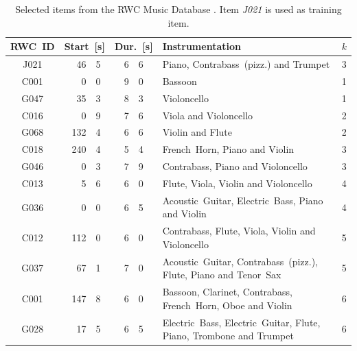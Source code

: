 \begin{table}[htb]
\center
\scriptsize
\begin{tabular}{cr@{.}lr@{.}lp{6cm}c}
\toprule[1.5pt]
RWC~ID & \multicolumn{2}{c}{Start~[s]} & \multicolumn{2}{c}{Dur.~[s]} & Instrumentation & \(k\)\\
\midrule
J021 & 46 & 5 & 6 & 6 & Piano, Contrabass~(pizz.) and Trumpet & 3\\
\hline
C001 & 0&0 & 9&0 & Bassoon & 1  \\
G047 & 35&3 & 8&3 & Violoncello & 1 \\
\hline
C016 & 0&9 & 7&6 & Viola and Violoncello & 2\\
G068 & 132&4 & 6&6 & Violin and Flute &  2\\
\hline
C018 & 240&4 & 5&4 & French~Horn, Piano and Violin & 3\\
G046 & 0&3 & 7&9 & Contrabass, Piano and Violoncello & 3\\
\hline
C013 & 5&6 & 6&0 & Flute, Viola, Violin and Violoncello & 4\\
G036 & 0&0 & 6&5 &  Acoustic~Guitar, Electric~Bass, Piano  and Violin & 4\\
\hline
C012 & 112&0 & 6&0 & Contrabass, Flute, Viola, Violin and  Violoncello & 5\\
G037 & 67&1 & 7&0 & Acoustic~Guitar, Contrabass~(pizz.), Flute, Piano and Tenor~Sax & 5\\
\hline
C001 & 147&8 & 6&0 & Bassoon, Clarinet, Contrabass, French~Horn, Oboe and Violin & 6\\
G028 & 17&5 & 6&5 & Electric~Bass, Electric~Guitar, Flute, Piano, Trombone and Trumpet & 6\\
\bottomrule[1.5pt]
\end{tabular}
\caption{Selected items from the RWC Music Database \cite{rwc}. Item \emph{J021} is used as training item.}
\label{tab:items}
\end{table}

